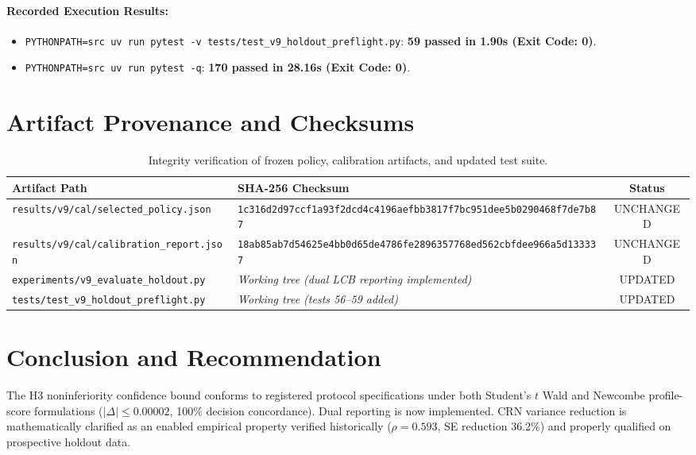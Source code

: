 \documentclass[10pt,a4paper]{article}
\begin{document}
\paragraph{Recorded Execution Results:}
\begin{itemize}
    \item \texttt{PYTHONPATH=src uv run pytest -v tests/test\_v9\_holdout\_preflight.py}: \textbf{59 passed in 1.90s (Exit Code: 0)}.
    \item \texttt{PYTHONPATH=src uv run pytest -q}: \textbf{170 passed in 28.16s (Exit Code: 0)}.
\end{itemize}

\section{Artifact Provenance and Checksums}

\begin{table}[h!]
\centering
\small
\begin{tabularx}{\textwidth}{l X c}
\toprule
\textbf{Artifact Path} & \textbf{SHA-256 Checksum} & \textbf{Status} \\
\midrule
\texttt{results/v9/cal/selected\_policy.json} & \texttt{1c316d2d97ccf1a93f2dcd4c4196aefbb3817f7bc951dee5b0290468f7de7b87} & UNCHANGED \\
\texttt{results/v9/cal/calibration\_report.json} & \texttt{18ab85ab7d54625e4bb0d65de4786fe2896357768ed562cbfdee966a5d133337} & UNCHANGED \\
\texttt{experiments/v9\_evaluate\_holdout.py} & \textit{Working tree (dual LCB reporting implemented)} & UPDATED \\
\texttt{tests/test\_v9\_holdout\_preflight.py} & \textit{Working tree (tests 56--59 added)} & UPDATED \\
\bottomrule
\end{tabularx}
\caption{Integrity verification of frozen policy, calibration artifacts, and updated test suite.}
\end{table}

\section{Conclusion and Recommendation}
\begin{center}
\end{center}
The H3 noninferiority confidence bound conforms to registered protocol specifications under both Student's $t$ Wald and Newcombe profile-score formulations ($|\Delta| \le 0.00002$, 100\% decision concordance). Dual reporting is now implemented. CRN variance reduction is mathematically clarified as an enabled empirical property verified historically ($\rho = 0.593$, SE reduction 36.2\%) and properly qualified on prospective holdout data.
\end{document}

